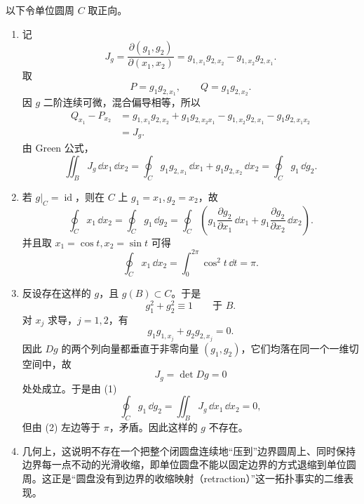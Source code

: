 \begin{xsolution}
以下令单位圆周 $C$ 取正向。
\begin{enumerate}[label=(\arabic*)]
\item 记
\[
  J_g=\frac{\partial(g_1,g_2)}{\partial(x_1,x_2)}
  =g_{1,x_1}g_{2,x_2}-g_{1,x_2}g_{2,x_1}.
\]
取
\[
  P=g_1g_{2,x_1},
  \qquad Q=g_1g_{2,x_2}.
\]
因 $g$ 二阶连续可微，混合偏导相等，所以
\begin{align*}
  Q_{x_1}-P_{x_2}
  &=g_{1,x_1}g_{2,x_2}+g_1g_{2,x_2x_1}
    -g_{1,x_2}g_{2,x_1}-g_1g_{2,x_1x_2}\\
  &=J_g.
\end{align*}
由 Green 公式，
\[
  \iint_BJ_g\,\dd x_1\,\dd x_2
  =\oint_Cg_1g_{2,x_1}\,\dd x_1
   +g_1g_{2,x_2}\,\dd x_2
  =\oint_Cg_1\,\dd g_2.
\]

\item 若 $g|_C=\operatorname{id}$，则在 $C$ 上 $g_1=x_1,g_2=x_2$，故
\[
  \oint_Cx_1\,\dd x_2
  =\oint_Cg_1\,\dd g_2
  =\oint_C\left(
    g_1\frac{\partial g_2}{\partial x_1}\,\dd x_1
    +g_1\frac{\partial g_2}{\partial x_2}\,\dd x_2
  \right).
\]
并且取 $x_1=\cos t,x_2=\sin t$ 可得
\[
  \oint_Cx_1\,\dd x_2=\int_0^{2\pi}\cos^2t\,\dd t=\pi.
\]

\item 反设存在这样的 $g$，且 $g(B)\subset C$。于是
\[
  g_1^2+g_2^2\equiv1\qquad\text{于 }B.
\]
对 $x_j$ 求导，$j=1,2$，有
\[
  g_1g_{1,x_j}+g_2g_{2,x_j}=0.
\]
因此 $Dg$ 的两个列向量都垂直于非零向量 $(g_1,g_2)$，它们均落在同一个一维切空间中，故
\[
  J_g=\det Dg=0
\]
处处成立。于是由 (1)
\[
  \oint_Cg_1\,\dd g_2=\iint_BJ_g\,\dd x_1\,\dd x_2=0,
\]
但由 (2) 左边等于 $\pi$，矛盾。因此这样的 $g$ 不存在。

\item 几何上，这说明不存在一个把整个闭圆盘连续地“压到”边界圆周上、同时保持边界每一点不动的光滑收缩，即单位圆盘不能以固定边界的方式退缩到单位圆周。这正是“圆盘没有到边界的收缩映射（retraction）”这一拓扑事实的二维表现。
\end{enumerate}
\end{xsolution}
